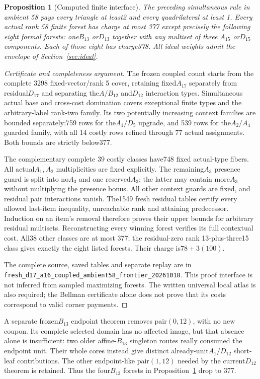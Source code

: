 \documentclass[11pt]{article}
\newtheorem{proposition}[theorem]{Proposition}
\theoremstyle{remark}\newtheorem{remark}[theorem]{Remark}
\newcommand{\cert}[1]{\nolinkurl{#1}}
\begin{document}
\begin{proposition}[Computed finite interface]\label{prop:oldcount}
The preceding simultaneous rule in ambient 58 pays every triangle at
least2 and every quadrilateral at least 1. Every actual rank 58 finite
forest has charge at most 377 except precisely the following eight formal
forests: one$B_{13}$ or$D_{13}$ together with any multiset of three
$A_{15}$ or$D_{15}$ components. Each of those eight has charge378.
All ideal weights admit the envelope of Section~\ref{sec:ideal}.
\end{proposition}
\begin{proof}[Certificate and completeness argument]
The frozen coupled count starts from the complete 3298 fixed-vector/rank 5
cover, retaining fixed$A_{17}$ separately from residual$D_{17}$ and
separating the$A/B_{12}$ and$D_{12}$ interaction types. Simultaneous actual
base and cross-cost domination covers exceptional finite types and the
arbitrary-label rank-two family. Its two potentially increasing context
families are bounded separately:759 rows for the$A_1/D_5$ upgrade, and
539 rows for the$A_2/A_4$ guarded family, with all 14 costly rows refined
through 77 actual assignments. Both bounds are strictly below377.

The complementary complete 39 costly classes have748 fixed actual-type
fibers. All actual$A_1,A_2$ multiplicities are fixed explicitly. The
remaining$A_3$ presence guard is split into no$A_3$ and one reserved$A_3$;
the latter may contain more$A_3$ without multiplying the presence bonus.
All other context guards are fixed, and residual pair interactions vanish.
The1549 fresh residual tables certify every allowed last-item inequality,
unreachable rank and attaining predecessor. Induction on an item's removal
therefore proves their upper bounds for arbitrary residual multisets.
Reconstructing every winning forest verifies its full contextual cost.
All38 other classes are at most 377; the residual-zero rank 13-plus-three15
class gives exactly the eight listed forests. Their charge is$78+3(100)$.

The complete source, saved tables and separate replay are in
\cert{fresh_d17_a16_coupled_ambient58_frontier_20261018}. This proof
interface is not inferred from sampled maximizing forests. The written
universal local atlas is also required; the Bellman certificate alone does
not prove that its costs correspond to valid corner payments.
\end{proof}

A separate frozen$B_{13}$ endpoint theorem removes pair$(0,12)$, with no
new coupon. Its complete selected domain has no affected image, but that
absence alone is insufficient: two older affine-$B_{13}$ singleton routes
really consumed the endpoint unit. Their whole cores instead give distinct
already-unit$A_1/D_{12}$ short-leaf contributions. The other endpoint-like
pair$(1,12)$ needed by the current$D_{12}$ theorem is retained. Thus the
four$B_{13}$ forests in Proposition~\ref{prop:oldcount} drop to 377.
\end{document}
